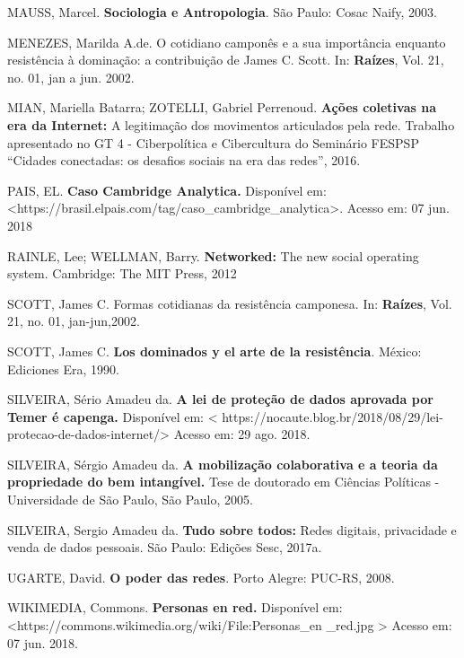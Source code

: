 MAUSS, Marcel. \textbf{Sociologia e Antropologia}. São Paulo: Cosac
Naify, 2003.

MENEZES, Marilda A.de. O cotidiano camponês e a sua importância enquanto
resistência à dominação: a contribuição de James C. Scott. In:
\textbf{Raízes}, Vol. 21, no. 01, jan a jun. 2002.

MIAN, Mariella Batarra; ZOTELLI, Gabriel Perrenoud. \textbf{Ações
coletivas na era da Internet:} A legitimação dos movimentos articulados
pela rede. Trabalho apresentado no GT 4 - Ciberpolítica e Cibercultura
do Seminário FESPSP ``Cidades conectadas: os desafios sociais na era das
redes'', 2016.

PAIS, EL. \textbf{Caso Cambridge Analytica.} Disponível em:
\textless{}https://brasil.elpais.com/tag/caso\_cambridge\_analytica\textgreater{}.
Acesso em: 07 jun. 2018

RAINLE, Lee; WELLMAN, Barry. \textbf{Networked:} The new social
operating system. Cambridge: The MIT Press, 2012

SCOTT, James C. Formas cotidianas da resistência camponesa. In:
\textbf{Raízes}, Vol. 21, no. 01, jan-jun,2002.

SCOTT, James C. \textbf{Los dominados y el arte de la resistência}.
México: Ediciones Era, 1990.

SILVEIRA, Sério Amadeu da. \textbf{A lei de proteção de dados aprovada
por Temer é capenga.} Disponível em: \textless{}
https://nocaute.blog.br/2018/08/29/lei-protecao-de-dados-internet/\textgreater{}
Acesso em: 29 ago. 2018.

SILVEIRA, Sérgio Amadeu da. \textbf{A mobilização colaborativa e a
teoria da propriedade do bem intangível.} Tese de doutorado em Ciências
Políticas - Universidade de São Paulo, São Paulo, 2005.

SILVEIRA, Sergio Amadeu da. \textbf{Tudo sobre todos:} Redes digitais,
privacidade e venda de dados pessoais. São Paulo: Edições Sesc, 2017a.

UGARTE, David. \textbf{O poder das redes}. Porto Alegre: PUC-RS, 2008.

WIKIMEDIA, Commons. \textbf{Personas en red.} Disponível em:
\textless{}https://commons.wikimedia.org/wiki/File:Personas\_en
\_red.jpg
\textgreater{} Acesso em: 07 jun. 2018.
